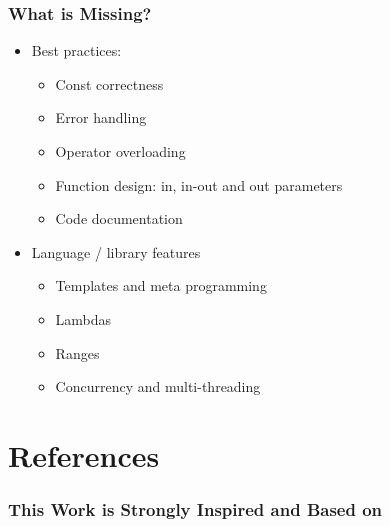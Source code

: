 \documentclass[usenames,dvipsnames,svgnames,table,aspectratio=169]{beamer}
\begin{document}
\begin{frame}
    \frametitle{What is Missing?}
    \begin{itemize}
        \item<+-> Best practices:
        \begin{itemize}
            \item<+-> Const correctness
            \item<+-> Error handling
            \item<+-> Operator overloading
            \item<+-> Function design: in, in-out and out parameters
            \item<+-> Code documentation
        \end{itemize}
        \item<+-> Language / library features
        \begin{itemize}
            \item<+-> Templates and meta programming
            \item<+-> Lambdas
            \item<+-> Ranges
            \item<+-> Concurrency and multi-threading
        \end{itemize}
    \end{itemize}

    

\end{frame}

\section*{References}
\begin{frame}
  \frametitle{This Work is Strongly Inspired and Based on}
  \printbibliography
\end{frame}
\end{document}
